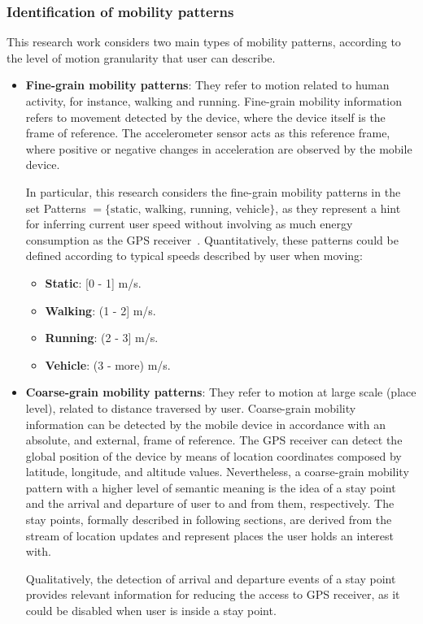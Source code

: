 \documentclass[ENG,PhD]{cinvestav}
\begin{document}
\subsubsection{Identification of mobility patterns}
This research work considers two main types of mobility patterns, according to the level of motion granularity that user can describe.
\begin{itemize}
  \item \textbf{Fine-grain mobility patterns}: They refer to motion related to human activity, for instance, walking and running.
  Fine-grain mobility information refers to movement detected by the device, where the device itself is the frame of reference.
  The accelerometer sensor acts as this reference frame, where positive or negative changes in acceleration are observed by the mobile device.

  In particular, this research considers the fine-grain mobility patterns in the set Patterns  $ = \{ \text{static, walking, running, vehicle} \}$, as they represent a hint for inferring current user speed without involving as much energy consumption as the GPS receiver~\cite{Abdesslem2009}.
  Quantitatively, these patterns could be defined according to typical speeds described by user when moving:
  \begin{itemize}
    \item \textbf{Static}: [0 - 1] m/s.
    \item \textbf{Walking}: (1 - 2] m/s.
    \item \textbf{Running}: (2 - 3] m/s. %
    \item \textbf{Vehicle}: (3 - more) m/s.
  \end{itemize}

  \item \textbf{Coarse-grain mobility patterns}: They refer to motion at large scale (place level), related to distance traversed by user.
  Coarse-grain mobility information can be detected by the mobile device in accordance with an absolute, and external, frame of reference.
  The GPS receiver can detect the global position of the device by means of location coordinates composed by latitude, longitude, and altitude values.
  Nevertheless, a coarse-grain mobility pattern with a higher level of semantic meaning is the idea of a stay point and the arrival and departure of user to and from them, respectively.
  The stay points, formally described in following sections, are derived from the stream of location updates and represent places the user holds an interest with.

  Qualitatively, the detection of arrival and departure events of a stay point provides relevant information for reducing the access to GPS receiver, as it could be disabled when user is inside a stay point.
\end{itemize}
\end{document}
